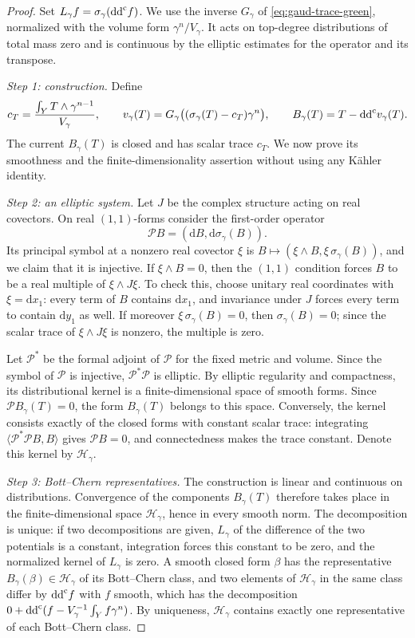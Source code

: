 \begin{proof}
Set $L_\gamma f=\sigma_\gamma(\mathrm{dd}^{\mathrm{c}} f)$. We use the inverse $G_\gamma$ of \eqref{eq:gaud-trace-green}, normalized with the volume form $\gamma^n/V_\gamma$. It acts on top-degree distributions of total mass zero and is continuous by the elliptic estimates for the operator and its transpose.

\emph{Step 1: construction.} Define
\[
 c_T=\frac{\int_YT\wedge\gamma^{n-1}}{V_\gamma},\qquad
 v_\gamma(T)=G_\gamma\bigl((\sigma_\gamma(T)-c_T)\gamma^n\bigr),\qquad
 B_\gamma(T)=T-\mathrm{dd}^{\mathrm{c}} v_\gamma(T).
\]
The current $B_\gamma(T)$ is closed and has scalar trace $c_T$. We now prove its smoothness and the finite-dimensionality assertion without using any K\"ahler identity.

\emph{Step 2: an elliptic system.} Let $J$ be the complex structure acting on real covectors. On real $(1,1)$-forms consider the first-order operator
\[
 \mathscr P B=(\mathrm{d}B,\mathrm{d}\sigma_\gamma(B)).
\]
Its principal symbol at a nonzero real covector $\xi$ is $B\mapsto(\xi\wedge B,\xi\,\sigma_\gamma(B))$, and we claim that it is injective. If $\xi\wedge B=0$, then the $(1,1)$ condition forces $B$ to be a real multiple of $\xi\wedge J\xi$. To check this, choose unitary real coordinates with $\xi=\mathrm{d}x_1$: every term of $B$ contains $\mathrm{d}x_1$, and invariance under $J$ forces every term to contain $\mathrm{d}y_1$ as well. If moreover $\xi\,\sigma_\gamma(B)=0$, then $\sigma_\gamma(B)=0$; since the scalar trace of $\xi\wedge J\xi$ is nonzero, the multiple is zero.

Let $\mathscr P^*$ be the formal adjoint of $\mathscr P$ for the fixed metric and volume. Since the symbol of $\mathscr P$ is injective, $\mathscr P^*\mathscr P$ is elliptic. By elliptic regularity and compactness, its distributional kernel is a finite-dimensional space of smooth forms. Since $\mathscr P B_\gamma(T)=0$, the form $B_\gamma(T)$ belongs to this space. Conversely, the kernel consists exactly of the closed forms with constant scalar trace: integrating $\langle\mathscr P^*\mathscr P B,B\rangle$ gives $\mathscr P B=0$, and connectedness makes the trace constant. Denote this kernel by $\mathscr H_\gamma$.

\emph{Step 3: Bott--Chern representatives.} The construction is linear and continuous on distributions. Convergence of the components $B_\gamma(T)$ therefore takes place in the finite-dimensional space $\mathscr H_\gamma$, hence in every smooth norm. The decomposition is unique: if two decompositions are given, $L_\gamma$ of the difference of the two potentials is a constant, integration forces this constant to be zero, and the normalized kernel of $L_\gamma$ is zero. A smooth closed form $\beta$ has the representative $B_\gamma(\beta)\in\mathscr H_\gamma$ of its Bott--Chern class, and two elements of $\mathscr H_\gamma$ in the same class differ by $\mathrm{dd}^{\mathrm{c}} f$ with $f$ smooth, which has the decomposition $0+\mathrm{dd}^{\mathrm{c}}(f-V_\gamma^{-1}\int_Yf\gamma^n)$. By uniqueness, $\mathscr H_\gamma$ contains exactly one representative of each Bott--Chern class.


\end{proof}
